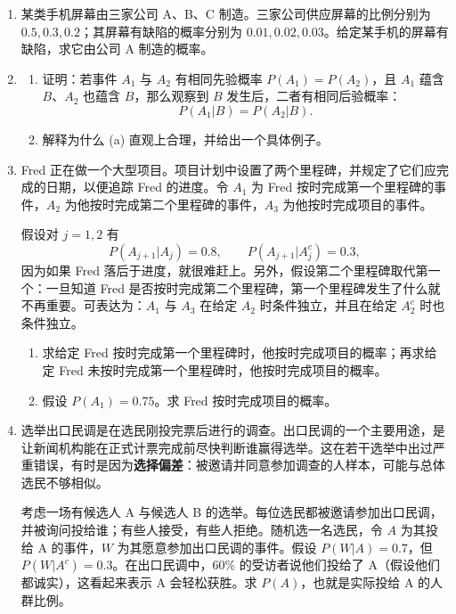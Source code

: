 \documentclass[UTF8, 12pt, fontset=fandol, oneside]{ctexart}
\begin{document}
\begin{enumerate}
  \item 某类手机屏幕由三家公司 A、B、C 制造。三家公司供应屏幕的比例分别为 $0.5,0.3,0.2$；其屏幕有缺陷的概率分别为 $0.01,0.02,0.03$。给定某手机的屏幕有缺陷，求它由公司 A 制造的概率。

  \item
  \begin{enumerate}
    \item 证明：若事件 $A_1$ 与 $A_2$ 有相同先验概率 $P(A_1)=P(A_2)$，且 $A_1$ 蕴含 $B$、$A_2$ 也蕴含 $B$，那么观察到 $B$ 发生后，二者有相同后验概率：
    \[
      P(A_1|B)=P(A_2|B).
    \]
    \item 解释为什么 (a) 直观上合理，并给出一个具体例子。
  \end{enumerate}

  \item Fred 正在做一个大型项目。项目计划中设置了两个里程碑，并规定了它们应完成的日期，以便追踪 Fred 的进度。令 $A_1$ 为 Fred 按时完成第一个里程碑的事件，$A_2$ 为他按时完成第二个里程碑的事件，$A_3$ 为他按时完成项目的事件。

  假设对 $j=1,2$ 有
  \[
    P(A_{j+1}|A_j)=0.8,\qquad P(A_{j+1}|A_j^c)=0.3,
  \]
  因为如果 Fred 落后于进度，就很难赶上。另外，假设第二个里程碑取代第一个：一旦知道 Fred 是否按时完成第二个里程碑，第一个里程碑发生了什么就不再重要。可表达为：$A_1$ 与 $A_3$ 在给定 $A_2$ 时条件独立，并且在给定 $A_2^c$ 时也条件独立。
  \begin{enumerate}
    \item 求给定 Fred 按时完成第一个里程碑时，他按时完成项目的概率；再求给定 Fred 未按时完成第一个里程碑时，他按时完成项目的概率。
    \item 假设 $P(A_1)=0.75$。求 Fred 按时完成项目的概率。
  \end{enumerate}

  \item 选举出口民调是在选民刚投完票后进行的调查。出口民调的一个主要用途，是让新闻机构能在正式计票完成前尽快判断谁赢得选举。这在若干选举中出过严重错误，有时是因为\textbf{选择偏差}：被邀请并同意参加调查的人样本，可能与总体选民不够相似。

  考虑一场有候选人 A 与候选人 B 的选举。每位选民都被邀请参加出口民调，并被询问投给谁；有些人接受，有些人拒绝。随机选一名选民，令 $A$ 为其投给 A 的事件，$W$ 为其愿意参加出口民调的事件。假设 $P(W|A)=0.7$，但 $P(W|A^c)=0.3$。在出口民调中，$60\%$ 的受访者说他们投给了 A（假设他们都诚实），这看起来表示 A 会轻松获胜。求 $P(A)$，也就是实际投给 A 的人群比例。


\end{enumerate}
\end{document}
